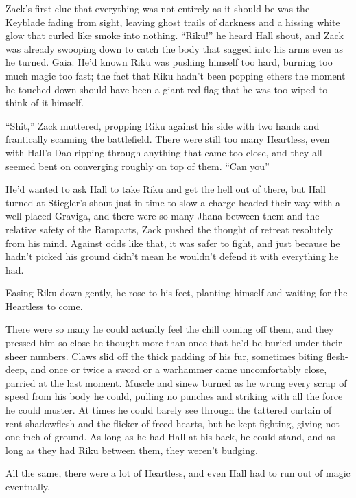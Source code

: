 \scenechange


Zack's first clue that everything was not entirely as it should be was the Keyblade fading from sight, leaving ghost trails of darkness and a hissing white glow that curled like smoke into nothing. ``Riku!'' he heard Hall shout, and Zack was already swooping down to catch the body that sagged into his arms even as he turned. Gaia. He'd known Riku was pushing himself too hard, burning too much magic too fast; the fact that Riku hadn't been popping ethers the moment he touched down should have been a giant red flag that he was too wiped to think of it himself.

``Shit,'' Zack muttered, propping Riku against his side with two hands and frantically scanning the battlefield. There were still too many Heartless, even with Hall's Dao ripping through anything that came too close, and they all seemed bent on converging roughly on top of them. ``Can you\textemdash ''

He'd wanted to ask Hall to take Riku and get the hell out of there, but Hall turned at Stiegler's shout just in time to slow a charge headed their way with a well-placed Graviga, and there were so many Jhana between them and the relative safety of the Ramparts, Zack pushed the thought of retreat resolutely from his mind. Against odds like that, it was safer to fight, and just because he hadn't picked his ground didn't mean he wouldn't defend it with everything he had.

Easing Riku down gently, he rose to his feet, planting himself and waiting for the Heartless to come.

There were so many he could actually feel the chill coming off them, and they pressed him so close he thought more than once that he'd be buried under their sheer numbers. Claws slid off the thick padding of his fur, sometimes biting flesh-deep, and once or twice a sword or a warhammer came uncomfortably close, parried at the last moment. Muscle and sinew burned as he wrung every scrap of speed from his body he could, pulling no punches and striking with all the force he could muster. At times he could barely see through the tattered curtain of rent shadowflesh and the flicker of freed hearts, but he kept fighting, giving not one inch of ground. As long as he had Hall at his back, he could stand, and as long as they had Riku between them, they weren't budging.

All the same, there were a lot of Heartless, and even Hall had to run out of magic eventually.

